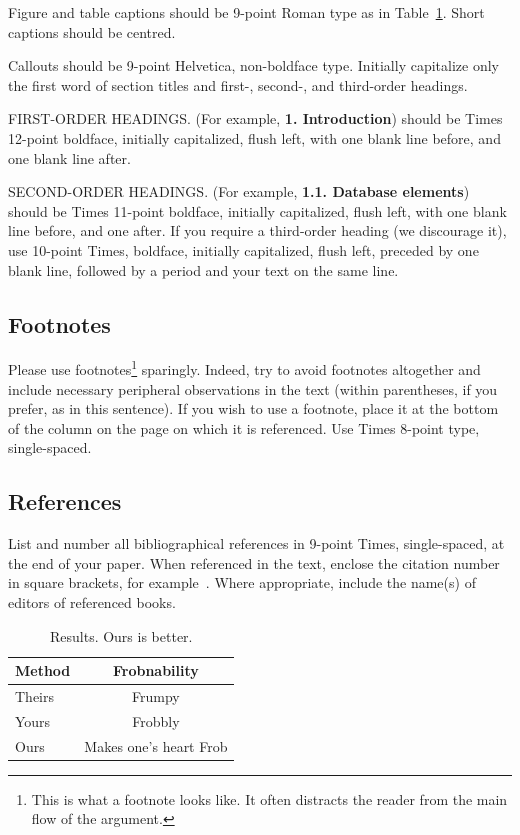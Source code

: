 \documentclass[10pt,twocolumn,letterpaper]{article}
\begin{document}
Figure and table captions should be 9-point Roman type as in
Table~\ref{mytable}. Short captions should be centred.

\noindent Callouts should be 9-point Helvetica, non-boldface type.
Initially capitalize only the first word of section titles and first-,
second-, and third-order headings.

FIRST-ORDER HEADINGS. (For example, {\large \bf 1. Introduction})
should be Times 12-point boldface, initially capitalized, flush left,
with one blank line before, and one blank line after.

SECOND-ORDER HEADINGS. (For example, { \bf 1.1. Database elements})
should be Times 11-point boldface, initially capitalized, flush left,
with one blank line before, and one after. If you require a third-order
heading (we discourage it), use 10-point Times, boldface, initially
capitalized, flush left, preceded by one blank line, followed by a period
and your text on the same line.

\subsection{Footnotes}

Please use footnotes\footnote {This is what a footnote looks like.  It
often distracts the reader from the main flow of the argument.} sparingly.
Indeed, try to avoid footnotes altogether and include necessary peripheral
observations in
the text (within parentheses, if you prefer, as in this sentence).  If you
wish to use a footnote, place it at the bottom of the column on the page on
which it is referenced. Use Times 8-point type, single-spaced.


\subsection{References}

List and number all bibliographical references in 9-point Times,
single-spaced, at the end of your paper. When referenced in the text,
enclose the citation number in square brackets, for
example~\cite{Authors14}.  Where appropriate, include the name(s) of
editors of referenced books.

\begin{table}
\begin{center}
\begin{tabular}{|l|c|}
\hline
Method & Frobnability \\
\hline\hline
Theirs & Frumpy \\
Yours & Frobbly \\
Ours & Makes one's heart Frob\\
\hline
\end{tabular}
\end{center}
\caption{Results. Ours is better.}
\label{mytable}
\end{table}
\end{document}
